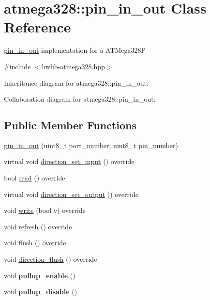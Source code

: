 \hypertarget{classatmega328_1_1pin__in__out}{}\section{atmega328\+:\+:pin\+\_\+in\+\_\+out Class Reference}
\label{classatmega328_1_1pin__in__out}


\hyperlink{classatmega328_1_1pin__in__out}{pin\+\_\+in\+\_\+out} implementation for a A\+T\+Mega328P  




{\ttfamily \#include $<$hwlib-\/atmega328.\+hpp$>$}



Inheritance diagram for atmega328\+:\+:pin\+\_\+in\+\_\+out\+:


Collaboration diagram for atmega328\+:\+:pin\+\_\+in\+\_\+out\+:
\subsection*{Public Member Functions}
\begin{DoxyCompactItemize}
\item 
\hyperlink{classatmega328_1_1pin__in__out_a438a355294e59a4f1b0f4f9ac35cebbb}{pin\+\_\+in\+\_\+out} (uint8\+\_\+t port\+\_\+number, uint8\+\_\+t pin\+\_\+number)
\item 
virtual void \hyperlink{classatmega328_1_1pin__in__out_a34896fc52b64f2a3c6d731e3cf0d75ca}{direction\+\_\+set\+\_\+input} () override
\item 
bool \hyperlink{classatmega328_1_1pin__in__out_ad30bd54f54fd54163ffb97e59ab52498}{read} () override
\item 
virtual void \hyperlink{classatmega328_1_1pin__in__out_acb994ef07be4c36fc8742d67f95ac6d4}{direction\+\_\+set\+\_\+output} () override
\item 
void \hyperlink{classatmega328_1_1pin__in__out_a2d6c30a028b57e2278e0f0024ba25460}{write} (bool v) override
\item 
void \hyperlink{classatmega328_1_1pin__in__out_ad335cf418492a0631cbd1e0d25e9d0a6}{refresh} () override
\item 
void \hyperlink{classatmega328_1_1pin__in__out_ab8c8298dc5d904dbc49f8b92e39abb7b}{flush} () override
\item 
void \hyperlink{classatmega328_1_1pin__in__out_a84bd2629cbf56882ae9cb986c928d33e}{direction\+\_\+flush} () override
\item 
\mbox{\label{classatmega328_1_1pin__in__out_a86f9ebfeecdd3efa3968ed3bd7cfd235}} 
void {\bfseries pullup\+\_\+enable} ()
\item 
\mbox{\label{classatmega328_1_1pin__in__out_a6ef7ff7d76d902e6e356d2e8e497012e}} 
void {\bfseries pullup\+\_\+disable} ()
\end{DoxyCompactItemize}


